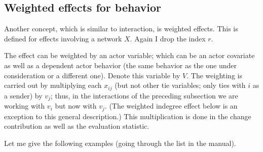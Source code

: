 \documentclass[a4paper,12pt,fleqn]{article}
\begin{document}
\subsection{Weighted effects for behavior}

Another concept, which is similar to interaction, is
weighted effects. This is defined for effects
involving a network $X$. Again I drop the index $r$.

The effect can be weighted by an actor variable;
which can be an actor covariate as well as a dependent actor behavior
(the same behavior as the one under consideration or a different one).
Denote this variable by $V$.
The weighting is carried out by multiplying each $x_{ij}$
(but not other tie variables; only ties with $i$
as a sender)
by $v_j$; thus, in the interactions of the preceding subsection
we are working with $v_i$ but now with $v_j$.
(The weighted indegree effect below is an exception to this general description.)
This multiplication is done in the change contribution
as well as the evaluation statistic.

Let me give the following examples (going through the list
in the manual).
\end{document}

